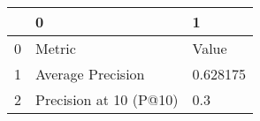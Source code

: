 \begin{tabular}{lll}
\toprule
{} &                       0 &         1 \\
\midrule
0 &                  Metric &     Value \\
1 &       Average Precision &  0.628175 \\
2 &  Precision at 10 (P@10) &       0.3 \\
\bottomrule
\end{tabular}
